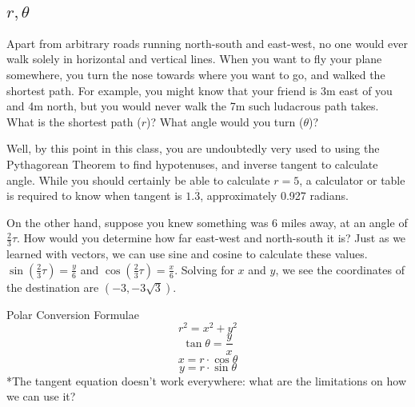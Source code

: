 
\subsection{$r, \theta$}
Apart from arbitrary roads running north-south and east-west, no one would ever walk solely
in horizontal and vertical lines.  When you want to fly your plane somewhere, you turn the
nose towards where you want to go, and walked the shortest path.  For example, you might
know that your friend is 3m east of you and 4m north, but you would never walk the 7m such 
ludacrous path takes.  What is the shortest path ($r$)?  What angle would you turn ($\theta$)?


Well, by this point in this class, you are undoubtedly very used to using the Pythagorean Theorem
to find hypotenuses, and inverse tangent to calculate angle.  While you should certainly be able to
calculate $r=5$, a calculator or table is required to know when tangent is $1.\overline{3}$, 
approximately 0.927 radians.

On the other hand, suppose you knew something was 6 miles away, at an angle of $\frac{2}{3}\tau$.
How would you determine how far east-west and north-south it is?  Just as we learned with vectors,
we can use sine and cosine to calculate these values.  $\sin(\frac{2}{3}\tau)=\frac{y}{6}$ and 
$\cos(\frac{2}{3}\tau)=\frac{x}{6}$.  Solving for $x$ and $y$, we see the coordinates of the
destination are $(-3,-3\sqrt{3})$.

\begin{derivation}{Polar Conversion Formulae}
\begin{equation}
	r^2=x^2+y^2
\end{equation}
\begin{equation}
	\tan\theta=\frac{y}{x}
\end{equation}
\begin{equation}
	x=r\cdot\cos\theta
\end{equation}
\begin{equation}
	y=r\cdot\sin\theta
\end{equation}
*The tangent equation doesn't work everywhere: what are the limitations on how we can use it?
\end{derivation}

